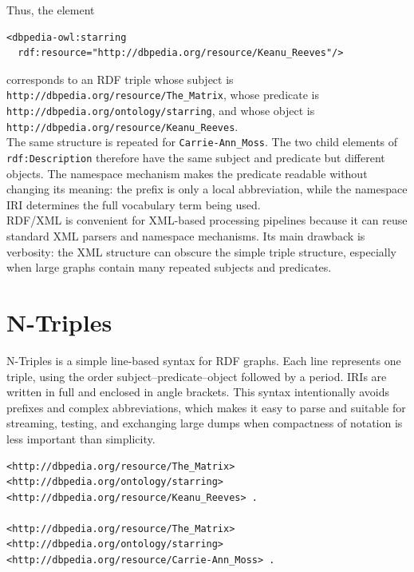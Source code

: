 \documentclass{scrbook}
\begin{document}
	Thus, the element
	
	\begin{lstlisting}
<dbpedia-owl:starring
  rdf:resource="http://dbpedia.org/resource/Keanu_Reeves"/>
	\end{lstlisting}
	
	corresponds to an RDF triple whose subject is \texttt{http://dbpedia.org/resource/The\_Matrix}, whose predicate is \texttt{http://dbpedia.org/ontology/starring}, and whose object is\\
	\texttt{http://dbpedia.org/resource/Keanu\_Reeves}.\\
	
	The same structure is repeated for \texttt{Carrie-Ann\_Moss}. The two child elements of \texttt{rdf:Description} therefore have the same subject and predicate but different objects. The namespace mechanism makes the predicate readable without changing its meaning: the prefix is only a local abbreviation, while the namespace IRI determines the full vocabulary term being used.\\
	
	RDF/XML is convenient for XML-based processing pipelines because it can reuse standard XML parsers and namespace mechanisms. Its main drawback is verbosity: the XML structure can obscure the simple triple structure, especially when large graphs contain many repeated subjects and predicates.
	
	\section{N-Triples}
	
	N-Triples is a simple line-based syntax for RDF graphs. Each line represents one triple, using the order subject--predicate--object followed by a period. IRIs are written in full and enclosed in angle brackets. This syntax intentionally avoids prefixes and complex abbreviations, which makes it easy to parse and suitable for streaming, testing, and exchanging large dumps when compactness of notation is less important than simplicity.
	
	\begin{lstlisting}
<http://dbpedia.org/resource/The_Matrix>
<http://dbpedia.org/ontology/starring>
<http://dbpedia.org/resource/Keanu_Reeves> .

<http://dbpedia.org/resource/The_Matrix>
<http://dbpedia.org/ontology/starring>
<http://dbpedia.org/resource/Carrie-Ann_Moss> .
	\end{lstlisting}
	
\end{document}
